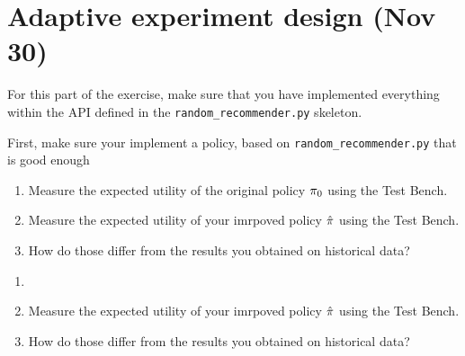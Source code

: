 \section{Adaptive experiment design (Nov 30)}
For this part of the exercise, make sure that you have implemented everything within the API defined in the \verb!random_recommender.py! skeleton.
\begin{exercise}
  First, make sure your implement a policy, based on \verb!random_recommender.py! that is good enough
  \begin{enumerate}
  \item Measure the expected utility of the original policy $\pi_0$ using the Test Bench.
  \item Measure the expected utility of your imrpoved policy $\hat{\pi}$ using the Test Bench.
  \item How do those differ from the results you obtained on historical data?
  \end{enumerate}
\end{exercise}

\begin{exercise}
  \begin{enumerate}
  \item 
  \item Measure the expected utility of your imrpoved policy $\hat{\pi}$ using the Test Bench.
  \item How do those differ from the results you obtained on historical data?
  \end{enumerate}
\end{exercise}






